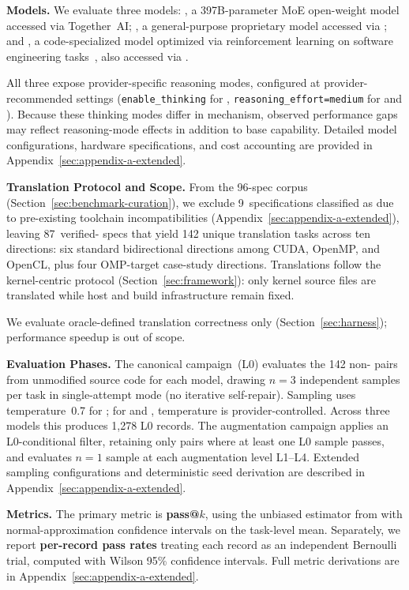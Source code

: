 \textbf{Models.}
We evaluate three models: \qwen{}, a 397B-parameter MoE open-weight model accessed via Together~AI; \gptnew{}, a general-purpose proprietary model accessed via \gptprovider{}; and \codex{}, a code-specialized model optimized via reinforcement learning on software engineering tasks~\cite{GPT53Codex2026}, also accessed via \gptprovider{}.

All three expose provider-specific reasoning modes, configured at provider-recommended settings (\texttt{enable\_thinking} for \qwenshort{}, \texttt{reasoning\_effort=medium} for \gptnew{} and \codex{}). Because these thinking modes differ in mechanism, observed performance gaps may reflect reasoning-mode effects in addition to base capability. Detailed model configurations, hardware specifications, and cost accounting are provided in Appendix~\ref{sec:appendix-a-extended}.

\textbf{Translation Protocol and Scope.}
From the 96-spec corpus (Section~\ref{sec:benchmark-curation}), we exclude 9~specifications classified as \knownfail{} due to pre-existing toolchain incompatibilities (Appendix~\ref{sec:appendix-a-extended}), leaving 87~verified-\pass{} specs that yield 142 unique translation tasks across ten directions: six standard bidirectional directions among CUDA, OpenMP, and OpenCL, plus four OMP-target case-study directions. Translations follow the kernel-centric protocol (Section~\ref{sec:framework}): only kernel source files are translated while host and build infrastructure remain fixed.

We evaluate oracle-defined translation correctness only (Section~\ref{sec:harness}); performance speedup is out of scope.

\textbf{Evaluation Phases.} 
The canonical campaign~(L0) evaluates the 142 non-\knownfail{} pairs from unmodified source code for each model, drawing $n=3$ independent samples per task in single-attempt mode (no iterative self-repair). Sampling uses temperature~0.7 for \qwenshort{}; for \gptnew{} and \codex{}, temperature is provider-controlled. Across three models this produces 1{,}278 L0 records. The augmentation campaign applies an L0-conditional filter, retaining only pairs where at least one L0 sample passes, and evaluates $n=1$
sample at each augmentation level L1--L4. Extended sampling configurations and deterministic seed derivation are described in Appendix~\ref{sec:appendix-a-extended}.

\textbf{Metrics.} 
The primary metric is \textbf{pass@$k$}, using the unbiased estimator from \citet{HumanEval2021} with normal-approximation confidence intervals on the task-level mean. Separately, we report \textbf{per-record pass rates} treating each record as an independent Bernoulli trial, computed with Wilson 95\% confidence intervals. Full metric derivations are in Appendix~\ref{sec:appendix-a-extended}.

